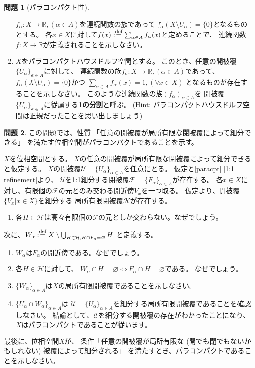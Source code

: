 \documentclass[uplatex]{jsarticle}
\theoremstyle{definition}
\newtheorem{prob}[prob]{問題}
\renewcommand{\emptyset}{\varnothing}
\newcommand{\dfn}{:\overset{\mbox{{\scriptsize def}}}{=}}
\newcommand{\R}{\mathbb{R}}
\newcommand{\mcF}{\mathcal{F}}
\newcommand{\mcH}{\mathcal{H}}
\newcommand{\mcU}{\mathcal{U}}
\begin{document}
\begin{prob}[パラコンパクト性]
\begin{enumerate}
    \(f_{\alpha}:X\to \R, (\alpha\in A)\)を連続関数の族であって
    \(f_{\alpha}(X\setminus U_{\alpha}) = \{0\}\)となるものとする。
    各\(x\in X\)に対して\(f(x)\dfn \sum_{\alpha\in A} f_{\alpha}(x)\)と定めることで、
    連続関数\(f:X\to \R\)が定義されることを示しなさい。
    \item
    \(X\)をパラコンパクトハウスドルフ空間とする。
    このとき、任意の開被覆\(\{U_{\alpha}\}_{\alpha\in A}\)に対して、
    連続関数の族\(f_{\alpha}:X\to \R, (\alpha\in A)\)であって、
    \(f_{\alpha}(X\setminus U_{\alpha}) = \{0\}\)かつ
    \(\sum_{\alpha\in A}f_{\alpha}(x) = 1, (\forall x\in X)\)
    となるものが存在することを示しなさい。
    このような連続関数の族\((f_{\alpha})_{\alpha\in A}\)を
    開被覆\(\{U_{\alpha}\}_{\alpha\in A}\)に従属する\textbf{1の分割}と呼ぶ。
    (Hint: パラコンパクトハウスドルフ空間は正規だったことを思い出しましょう)
  \end{enumerate}
\end{prob}



\begin{prob}\label{paracpt closed refinement}
  この問題では、性質
  「任意の開被覆が局所有限な\textbf{閉}被覆によって細分できる」
  を満たす位相空間がパラコンパクトであることを示す。

  \(X\)を位相空間とする。
  \(X\)の任意の開被覆が局所有限な閉被覆によって細分できると仮定する。
  \(X\)の開被覆\(\mcU = \{U_{\alpha}\}_{\alpha\in A}\)を任意にとる。
  仮定と\autoref{paracpt} \ref{1:1 refinement}より、
  \(\mcU\)を1:1細分する閉被覆\(\mcF = \{F_{\alpha}\}_{\alpha\in A}\)が存在する。
  各\(x\in X\)に対し、有限個の\(\mcF\)の元とのみ交わる開近傍\(V_x\)を一つ取る。
  仮定より、開被覆\(\{V_x| x\in X\}\)を細分する
  局所有限閉被覆\(\mcH\)が存在する。
  \begin{enumerate}
    \item 各\(H\in \mcH\)は高々有限個の\(\mcF\)の元としか交わらない。なぜでしょう。
  \end{enumerate}
  次に、\(W_{\alpha} \dfn X\setminus \bigcup_{H\in \mcH, H\cap F_{\alpha} = \emptyset} H\)
  と定義する。
  \begin{enumerate}[start=2]
    \item
    \(W_{\alpha}\)は\(F_{\alpha}\)の開近傍である。なぜでしょう。
    \item
    各\(H\in \mcH\)に対して、
    \(W_{\alpha} \cap H = \emptyset \iff F_{\alpha} \cap H = \emptyset\)である。
    なぜでしょう。
    \item
    \(\{W_{\alpha}\}_{\alpha\in A}\)は\(X\)の局所有限開被覆であることを示しなさい。
    \item
    \(\{U_{\alpha} \cap W_{\alpha}\}_{\alpha\in A}\)は
    \(\mcU = \{U_{\alpha}\}_{\alpha\in A}\)を細分する局所有限開被覆であることを確認しなさい。
    結論として、\(\mcU\)を細分する開被覆の存在がわかったことになり、
    \(X\)はパラコンパクトであることが従います。
  \end{enumerate}
  最後に、位相空間\(X\)が、
  条件「任意の開被覆が局所有限な (開でも閉でもないかもしれない) 被覆によって細分される」
  を満たすとき、パラコンパクトであることを示しなさい。
\end{prob}
\end{document}
